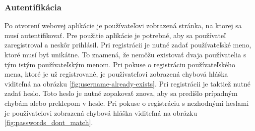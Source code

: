 \subsubsection{Autentifikácia}
Po otvorení webovej aplikácie je používateľovi zobrazená stránka, na ktorej sa musí autentifikovať. Pre použitie aplikácie je potrebné, aby sa používateľ zaregistroval a neskôr prihlásil. Pri registrácii je nutné zadať používateľské meno, ktoré musí byť unikátne. To znamená, že nemôžu existovať dvaja používatelia s tým istým používateľským menom. Pri pokuse o registráciu používateľského mena, ktoré je už registrované, je používateľovi zobrazená chybová hláška viditeľná na obrázku \ref{fig:username-already-exists}. Pri registrácii je taktiež nutné zadať heslo. Toto heslo je nutné zopakovať znova, aby sa predišlo prípadným chybám alebo preklepom v hesle. Pri pokuse o registráciu s nezhodnými heslami je používateľovi zobrazená chybová hláška viditeľná na obrázku \ref{fig:passwords_dont_match}.

